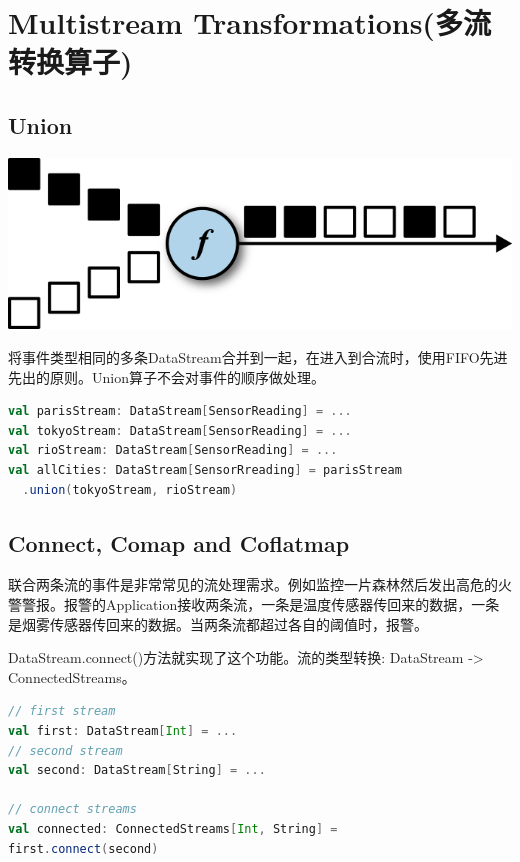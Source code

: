 \documentclass[oneside]{ctexbook}
\begin{document}
\section{Multistream Transformations(多流转换算子)}

\subsection{Union}

\noindent \includegraphics[width=\textwidth]{union.png}

将事件类型相同的多条DataStream合并到一起，在进入到合流时，使用FIFO先进先出的原则。Union算子不会对事件的顺序做处理。

\begin{lstlisting}[language=scala, breaklines]
val parisStream: DataStream[SensorReading] = ...
val tokyoStream: DataStream[SensorReading] = ...
val rioStream: DataStream[SensorReading] = ...
val allCities: DataStream[SensorRreading] = parisStream
  .union(tokyoStream, rioStream)
\end{lstlisting}

\subsection{Connect, Comap and Coflatmap}

联合两条流的事件是非常常见的流处理需求。例如监控一片森林然后发出高危的火警警报。报警的Application接收两条流，一条是温度传感器传回来的数据，一条是烟雾传感器传回来的数据。当两条流都超过各自的阈值时，报警。

DataStream.connect()方法就实现了这个功能。流的类型转换: DataStream -> ConnectedStreams。

\begin{lstlisting}[language=scala, breaklines]
// first stream
val first: DataStream[Int] = ...
// second stream
val second: DataStream[String] = ...

// connect streams
val connected: ConnectedStreams[Int, String] =
first.connect(second)
\end{lstlisting}
\end{document}
